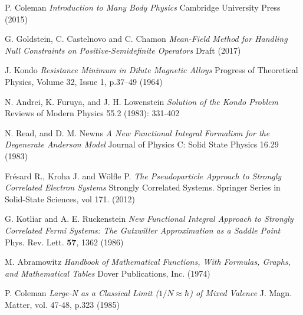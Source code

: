 \documentclass[12pt]{article}
\begin{document}
\newpage



\begin{thebibliography}{1}

P. Coleman
\emph{Introduction to Many Body Physics}
Cambridge University Press (2015)

G. Goldstein, C. Castelnovo and C. Chamon
\emph{Mean-Field Method for Handling Null Constraints on Positive-Semidefinite Operators}
Draft (2017)

J. Kondo
\emph{Resistance Minimum in Dilute Magnetic Alloys}
Progress of Theoretical Physics, Volume 32, Issue 1, p.37–49 (1964)

N. Andrei, K. Furuya, and J. H. Lowenstein
\emph{Solution of the Kondo Problem}
Reviews of Modern Physics 55.2 (1983): 331-402

N. Read, and D. M. Newns
\emph{A New Functional Integral Formalism for the Degenerate Anderson Model} Journal of Physics C: Solid State Physics 16.29 (1983)

Frésard R., Kroha J. and Wölfle P.
\emph{The Pseudoparticle Approach to Strongly Correlated Electron Systems}
Strongly Correlated Systems. Springer Series in Solid-State Sciences, vol 171. (2012)

G. Kotliar and A. E. Ruckenstein
\emph{New Functional Integral Approach to Strongly Correlated Fermi Systems: The Gutzwiller Approximation as a Saddle Point}
Phys. Rev. Lett. \textbf{57}, 1362 (1986)

M. Abramowitz
\emph{Handbook of Mathematical Functions, With Formulas, Graphs, and Mathematical Tables}
Dover Publications, Inc. (1974)

P. Coleman
\emph{Large-N as a Classical Limit ($ 1 / N \approx \hbar $) of Mixed Valence}
J. Magn. Matter, vol. 47-48, p.323 (1985)




\end{thebibliography}
\end{document}
